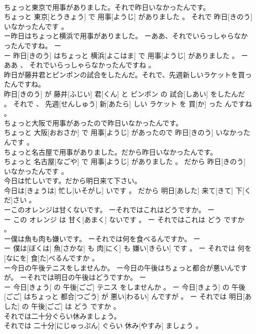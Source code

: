 \documentclass[8pt]{extreport}
\begin{document}
\begin{CJK}{UTF8}{min}
\\	ちょっと東京で用事がありました。それで昨日いなかったんです。	
\\	ちょっと 東京[とうきょう] で 用事[ようじ] がありました 。 それで 昨日[きのう] いなかったんです 。
\\	ー昨日はちょっと横浜で用事がありました。 ーああ、それでいらっしゃらなかったんですね。	ー
\\	ー 昨日[きのう] はちょっと 横浜[よこはま] で 用事[ようじ] がありました 。 ー ああ 、 それでいらっしゃらなかったんですね 。
\\	昨日が藤井君とピンポンの試合をしたんだ。それで、先週新しいラケットを買ったんですね。	
\\	昨日[きのう] が 藤井[ふじい] 君[くん] と ピンポン の 試合[しあい] をしたんだ 。 それで 、 先週[せんしゅう] 新[あたら] しい ラケット を 買[か] った んですね 。
\\	ちょっと大阪で用事があったので昨日いなかったんです。	
\\	ちょっと 大阪[おおさか] で 用事[ようじ] があったので 昨日[きのう] いなかったんです 。
\\	ちょっと名古屋で用事がありました。だから昨日いなかったんです。	
\\	ちょっと 名古屋[なごや] で 用事[ようじ] がありました 。 だから 昨日[きのう] いなかったんです 。
\\	今日は忙しいです。だから明日来て下さい。	
\\	今日は[きょうは] 忙し[いそがし] いです 。 だから 明日[あした] 来て[きて] 下[くだ]さい 。
\\	ーこのオレンジは甘くないです。 ーそれではこれはどうですか。	ー
\\	ー この オレンジ は 甘く[あまく] ないです 。 ー それではこれは どう ですか 。
\\	ー僕は魚も肉も嫌いです。 ーそれでは何を食べるんですか。	ー
\\	ー 僕は[ぼくは] 魚[さかな] も 肉[にく] も 嫌い[きらい] です 。 ー それでは 何を[なにを] 食[た]べるんですか 。
\\	ー今日の午後テニスをしませんか。 ー今日の午後はちょっと都合が悪いんですが。 ーそれでは明日の午後はどうですか。	ー
\\	ー 今日[きょう] の 午後[ごご] テニス をしませんか 。 ー 今日[きょう] の 午後[ごご] はちょっと 都合[つごう] が 悪い[わるい] んですが 。 ー それでは 明日[あした] の 午後[ごご] は どう ですか 。
\\	それでは二十分ぐらい休みましょう。	
\\	それでは 二十分[にじゅっぷん] ぐらい 休み[やすみ] ましょう 。

\end{CJK}
\end{document}
